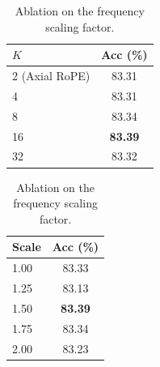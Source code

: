 \begin{table}[t]
    \centering
    \begin{minipage}[t]{0.48\columnwidth}
        \centering
        \caption{Ablation on the number of directions $K$.}
        \label{tab:ablation_k}
        \vspace{0.5em}
        \begin{small}
            \begin{sc}
                \begin{tabular}{lc}
                    \toprule
                    $K$ & Acc (\%) \\
                    \midrule
                    2 (Axial RoPE) & 83.31 \\
                    4 & 83.31 \\
                    8 & 83.34 \\
                    16 & \textbf{83.39} \\
                    32 & 83.32 \\
                    \bottomrule
                \end{tabular}
            \end{sc}
        \end{small}
    \end{minipage}
    \hfill
    \begin{minipage}[t]{0.48\columnwidth}
        \centering
        \caption{Ablation on the frequency scaling factor.}
        \label{tab:ablation_freq}
        \vspace{0.5em}
        \begin{small}
            \begin{sc}
                \begin{tabular}{lc}
                    \toprule
                    Scale & Acc (\%) \\
                    \midrule
                    1.00 & 83.33 \\
                    1.25 & 83.13 \\
                    1.50 & \textbf{83.39} \\
                    1.75 & 83.34 \\
                    2.00 & 83.23 \\
                    \bottomrule
                \end{tabular}
            \end{sc}
        \end{small}
    \end{minipage}
    \vskip -0.1in
\end{table}
